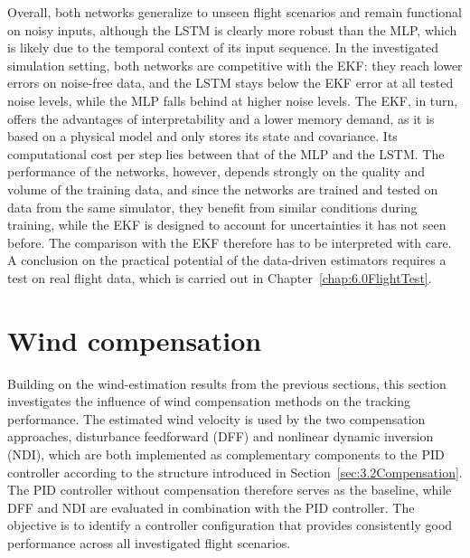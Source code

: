 Overall, both networks generalize to unseen flight scenarios and remain functional on noisy inputs, although the LSTM is clearly more robust than the MLP, which is likely due to the temporal context of its input sequence. In the investigated simulation setting, both networks are competitive with the EKF: they reach lower errors on noise-free data, and the LSTM stays below the EKF error at all tested noise levels, while the MLP falls behind at higher noise levels. The EKF, in turn, offers the advantages of interpretability and a lower memory demand, as it is based on a physical model and only stores its state and covariance. Its computational cost per step lies between that of the MLP and the LSTM. The performance of the networks, however, depends strongly on the quality and volume of the training data, and since the networks are trained and tested on data from the same simulator, they benefit from similar conditions during training, while the EKF is designed to account for uncertainties it has not seen before. The comparison with the EKF therefore has to be interpreted with care. A conclusion on the practical potential of the data-driven estimators requires a test on real flight data, which is carried out in Chapter~\ref{chap:6.0FlightTest}.





\section{Wind compensation}
\label{sec:5.2WindCompensation}

Building on the wind-estimation results from the previous sections, this section investigates the influence of wind compensation methods on the tracking performance. The estimated wind velocity is used by the two compensation approaches, disturbance feedforward (DFF) and nonlinear dynamic inversion (NDI), which are both implemented as complementary components to the PID controller according to the structure introduced in Section~\ref{sec:3.2Compensation}. The PID controller without compensation therefore serves as the baseline, while DFF and NDI are evaluated in combination with the PID controller. The objective is to identify a controller configuration that provides consistently good performance across all investigated flight scenarios.

